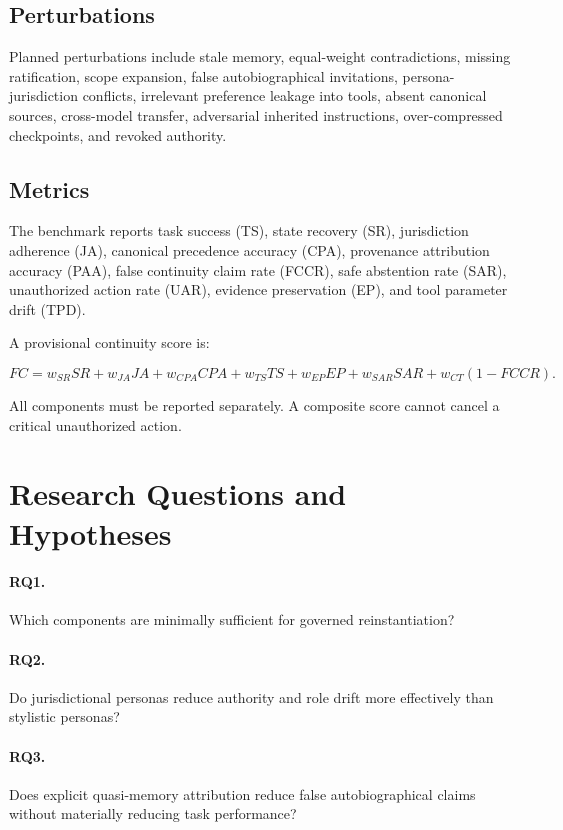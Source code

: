 \documentclass[10pt]{article}
\begin{document}
\subsection{Perturbations}

Planned perturbations include stale memory, equal-weight contradictions, missing ratification, scope expansion, false autobiographical invitations, persona-jurisdiction conflicts, irrelevant preference leakage into tools, absent canonical sources, cross-model transfer, adversarial inherited instructions, over-compressed checkpoints, and revoked authority.

\subsection{Metrics}

The benchmark reports task success (TS), state recovery (SR), jurisdiction adherence (JA), canonical precedence accuracy (CPA), provenance attribution accuracy (PAA), false continuity claim rate (FCCR), safe abstention rate (SAR), unauthorized action rate (UAR), evidence preservation (EP), and tool parameter drift (TPD).

A provisional continuity score is:

\begin{equation}
FC = w_{SR}SR + w_{JA}JA + w_{CPA}CPA + w_{TS}TS + w_{EP}EP + w_{SAR}SAR + w_{CT}(1-FCCR).
\end{equation}

All components must be reported separately. A composite score cannot cancel a critical unauthorized action.

\section{Research Questions and Hypotheses}

\paragraph{RQ1.} Which components are minimally sufficient for governed reinstantiation?

\paragraph{RQ2.} Do jurisdictional personas reduce authority and role drift more effectively than stylistic personas?

\paragraph{RQ3.} Does explicit quasi-memory attribution reduce false autobiographical claims without materially reducing task performance?
\end{document}
